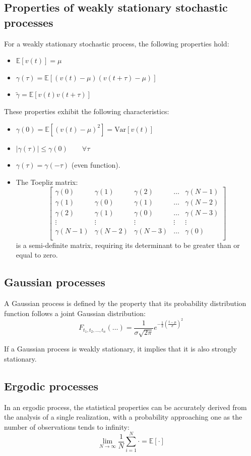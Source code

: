 \subsection{Properties of weakly stationary stochastic processes}
For a weakly stationary stochastic process, the following properties hold:
\begin{itemize}
    \item $\mathbb{E}\left[ v(t) \right]=\mu$ 
    \item $\gamma(\tau)=\mathbb{E}\left[ (v(t)-\mu)(v(t+\tau)-\mu) \right]$
    \item $\tilde{\gamma}=\mathbb{E}\left[v(t)v(t+\tau)\right]$
\end{itemize}
These properties exhibit the following characteristics:
\begin{itemize}
    \item $\gamma(0)=\mathbb{E}\left[\left(v(t)-\mu\right)^2\right]=\text{Var}\left[v(t)\right]$
    \item $\left\lvert \gamma(\tau) \right\rvert \leq \gamma(0) \qquad \forall\tau$
    \item $\gamma(\tau)=\gamma(-\tau)$ (even function). 
    \item The Toepliz matrix:
        \[\begin{bmatrix}
            \gamma(0)   & \gamma(1)     & \gamma(2)     & \dots     & \gamma(N-1)   \\
            \gamma(1)   & \gamma(0)     & \gamma(1)     & \dots     & \gamma(N-2)   \\
            \gamma(2)   & \gamma(1)     & \gamma(0)     & \dots     & \gamma(N-3)   \\
            \vdots      & \vdots        & \vdots        & \vdots    & \vdots        \\
            \gamma(N-1) & \gamma(N-2)   & \gamma(N-3)   & \dots     & \gamma(0)     \\
        \end{bmatrix}\]
        is a semi-definite matrix, requiring its determinant to be greater than or equal to zero.
\end{itemize}

\subsection{Gaussian processes}
A Gaussian process is defined by the property that its probability distribution function follows a joint Gaussian distribution:
\[F_{t_1,t_2,\dots,t_n}(\dots)=\dfrac{1}{\sigma\sqrt{2\pi}}e^{-\frac{1}{2}\left(\frac{t-\mu}{\sigma}\right)^2}\]
\begin{property}
    If a Gaussian process is weakly stationary, it implies that it is also strongly stationary.
\end{property}

\subsection{Ergodic processes}
In an ergodic process, the statistical properties can be accurately derived from the analysis of a single realization, with a probability approaching one as the number of observations tends to infinity:
\[\lim_{N \rightarrow \infty}\dfrac{1}{N}\sum_{i=1}^N\cdot = \mathbb{E}\left[\cdot\right]\]